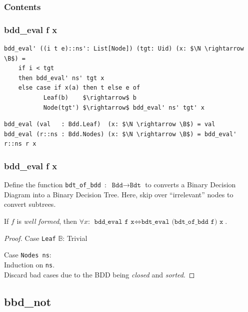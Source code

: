 \documentclass[english, aspectratio=169]{beamer}
\newcommand{\B}[0]{\ensuremath{\mathbb{B}}}
\begin{document}
\begin{frame}{}
  \frametitle{Contents}
\end{frame}

\begin{frame}[fragile]
  \frametitle{bdd\_eval f x}

  \begin{lstlisting}
bdd_eval' ((i t e)::ns': List[Node]) (tgt: Uid) (x: $\N \rightarrow \B$) =
    if i < tgt
    then bdd_eval' ns' tgt x
    else case if x(a) then t else e of
           Leaf(b)    $\rightarrow$ b
           Node(tgt') $\rightarrow$ bdd_eval' ns' tgt' x
   \end{lstlisting}
   \begin{lstlisting}[firstnumber=7]
bdd_eval (val   : Bdd.Leaf)  (x: $\N \rightarrow \B$) = val
bdd_eval (r::ns : Bdd.Nodes) (x: $\N \rightarrow \B$) = bdd_eval' r::ns r x
  \end{lstlisting}
\end{frame}

\begin{frame}
  \frametitle{bdd\_eval f x}

  Define the function \texttt{bdt\_of\_bdd}~:~$\texttt{Bdd} \rightarrow \texttt{Bdt}$ to converts a
  Binary Decision Diagram into a Binary Decision Tree. Here, skip over ``irrelevant'' nodes to
  convert subtrees.

  \pause

  \begin{theorem}
    If $f$ is \emph{well formed}, then $\forall x$:
    $\texttt{bdd\_eval f x} \iff \texttt{bdt\_eval (bdt\_of\_bdd f) x}$.
  \end{theorem}
  \begin{proof}
    Case \texttt{Leaf} $\B$: Trivial

    Case \texttt{Nodes ns}:\\
    \quad Induction on \texttt{ns}.\\
    \quad Discard bad cases due to the BDD being \emph{closed} and \emph{sorted}.
  \end{proof}
\end{frame}

\subsection{bbd\_not}
\end{document}
